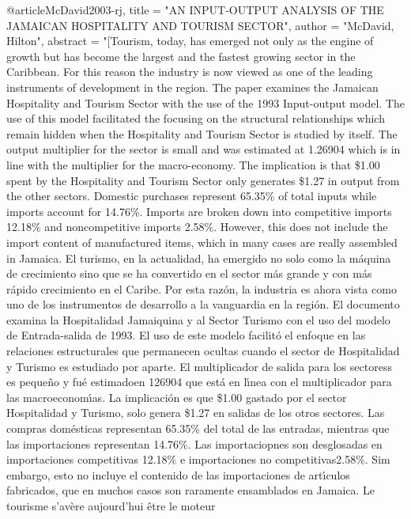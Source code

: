 {@article{McDavid2003-rj,
	title     = "{AN} {INPUT-OUTPUT} {ANALYSIS} {OF} {THE} {JAMAICAN}
	{HOSPITALITY} {AND} {TOURISM} {SECTOR}",
	author    = "McDavid, Hilton",
	abstract  = "[Tourism, today, has emerged not only as the engine of growth
	but has become the largest and the fastest growing sector in the
	Caribbean. For this reason the industry is now viewed as one of
	the leading instruments of development in the region. The paper
	examines the Jamaican Hospitality and Tourism Sector with the
	use of the 1993 Input-output model. The use of this model
	facilitated the focusing on the structural relationships which
	remain hidden when the Hospitality and Tourism Sector is studied
	by itself. The output multiplier for the sector is small and was
	estimated at 1.26904 which is in line with the multiplier for
	the macro-economy. The implication is that \$1.00 spent by the
	Hospitality and Tourism Sector only generates \$1.27 in output
	from the other sectors. Domestic purchases represent 65.35\% of
	total inputs while imports account for 14.76\%. Imports are
	broken down into competitive imports 12.18\% and noncompetitive
	imports 2.58\%. However, this does not include the import
	content of manufactured items, which in many cases are really
	assembled in Jamaica. El turismo, en la actualidad, ha emergido
	no solo como la m{\'a}quina de crecimiento sino que se ha
	convertido en el sector m{\'a}s grande y con m{\'a}s r{\'a}pido
	crecimiento en el Caribe. Por esta raz{\'o}n, la industria es
	ahora vista como uno de los instrumentos de desarrollo a la
	vanguardia en la regi{\'o}n. El documento examina la
	Hospitalidad Jamaiquina y al Sector Turismo con el uso del
	modelo de Entrada-salida de 1993. El uso de este modelo
	facilit{\'o} el enfoque en las relaciones estructurales que
	permanecen ocultas cuando el sector de Hospitalidad y Turismo es
	estudiado por aparte. El multiplicador de salida para los
	sectoress es peque{\~n}o y fu{\'e} estimadoen 126904 que
	est{\'a} en l{\'\i}nea con el multiplicador para las
	macroeconom{\'\i}as. La implicaci{\'o}n es que \$1.00 gastado
	por el sector Hospitalidad y Turismo, solo genera \$1.27 en
	salidas de los otros sectores. Las compras dom{\'e}sticas
	representan 65.35\% del total de las entradas, mientras que las
	importaciones representan 14.76\%. Las importaciopnes son
	desglosadas en importaciones competitivas 12.18\% e
	importaciones no competitivas2.58\%. Sim embargo, esto no
	incluye el contenido de las importaciones de art{\'\i}culos
	fabricados, que en muchos casos son raramente ensamblados en
	Jamaica. Le tourisme s'av{\`e}re aujourd'hui {\^e}tre le moteur
}}
